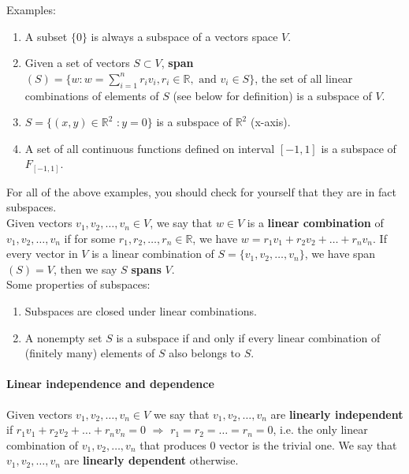 \documentclass[12pt,oneside]{article}
\begin{document}
\noindent Examples:
\begin{enumerate}
\item A subset $\{0\}$ is always a subspace of a vectors space $V$.
\item Given a set of vectors $ S \subset V$, \textbf{span}\((S)=\{w : w=\sum_{i=1}^n r_iv_i, r_i \in \mathbb{R}, \text{ and } v_i \in S\} \), the set of
  all linear combinations of elements of \(S\) (see below for definition) is a
  subspace of $V$.
\item $S = \{(x,y) \in {\mathbb{R}}^{2}$ $: y = 0 \}$ is a subspace of
  ${\mathbb{R}}^{2}$ (x-axis).
\item A set of all continuous functions defined on interval $[-1, 1]$
  is a subspace of $F_{[-1, 1]}$.

\end{enumerate}
For all of the above examples, you should check for yourself that they
are in fact subspaces. \\

Given vectors $v_{1}, v_{2}, \ldots, v_{n} \in V$, we say that $w \in
V$ is a \textbf{linear combination} of $v_{1}, v_{2}, \ldots, v_{n}$
if for some $r_{1}, r_{2}, \ldots, r_{n} \in \mathbb{R}$, we have $w =
r_{1} v_{1} + r_{2} v_{2} + \ldots + r_{n} v_{n}$. If every vector in
$V$ is a linear combination of $S=\{v_{1}, v_{2}, \ldots, v_{n}\}$,
we have span\((S)=V\), then we say \(S\) \textbf{spans} $V$.\\


\noindent Some properties of subspaces:
\begin{enumerate}
\item Subspaces are closed under linear combinations.
\item A nonempty set $S$ is a subspace if and only if every linear
combination of (finitely many) elements of $S$ also belongs to $S$. \\
  \end{enumerate}

\paragraph{Linear independence and dependence} 
Given vectors $v_{1}, v_{2}, \ldots, v_{n} \in V$ we say that $v_{1},
v_{2}, \ldots, v_{n}$ are \textbf{linearly independent} if $r_{1}
v_{1} + r_{2} v_{2} + \ldots + r_{n} v_{n} = 0$ $\Longrightarrow$
$r_{1} = r_{2} = \ldots = r_{n} = 0$, i.e. the only linear combination
of $v_{1}, v_{2}, \ldots, v_{n}$ that produces $0$ vector is the
trivial one. We say that $v_{1}, v_{2}, \ldots, v_{n}$ are
\textbf{linearly dependent} otherwise.\\
\end{document}

